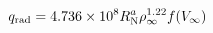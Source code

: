 \documentclass[10pt]{article}
\begin{document}
\begin{align*}q_{\rm rad} = 4.736 \times 10^{8} R_{\rm N}^{a} \rho_{\infty}^{1.22} f (V_{\infty}) 
\end{align*}
\end{document}

